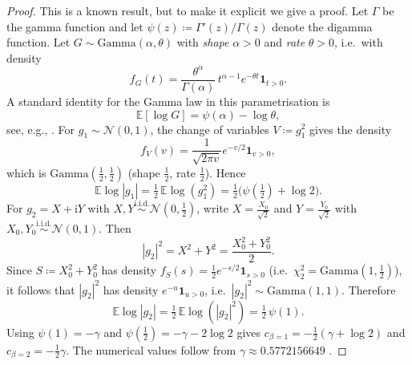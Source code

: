 \documentclass[11pt,a4paper]{article}
\newcommand{\be}{\begin{equation}}
\newcommand{\ee}{\end{equation}}
\begin{document}
\begin{proof}
This is a known result, but to make it explicit we give a proof. Let $\Gamma$ be the gamma function and let $\psi(z)\coloneq \Gamma'(z)/\Gamma(z)$ denote the digamma function.
Let $G\sim\mathrm{Gamma}(\alpha,\theta)$ with \textit{shape} $\alpha>0$ and \emph{rate} $\theta>0$, i.e.\ with density
\be
f_G(t)=\frac{\theta^\alpha}{\Gamma(\alpha)}\,t^{\alpha-1}e^{-\theta t}\mathbf 1_{t>0}.
\ee
A standard identity for the Gamma law in this parametrisation is
\be\label{eq:elog-gamma}
\mathbb E[\log G]=\psi(\alpha)-\log\theta,
\ee
see, e.g., \cite[Ex.~1.25]{JorgensenLabouriau2012}. For $g_1\sim\mathcal N(0,1)$, the change of variables $V\coloneq g_1^2$ gives the density
\be
f_V(v)=\frac{1}{\sqrt{2\pi v}}e^{-v/2}\mathbf 1_{v>0},
\ee
which is $\mathrm{Gamma}(\tfrac12,\tfrac12)$ (shape $\tfrac12$, rate $\tfrac12$). Hence
\be
\mathbb E\log|g_1|=\tfrac12\,\mathbb E\log(g_1^2)=\tfrac12\big(\psi(\tfrac12)+\log 2\big).
\ee
For $g_2=X+\mathrm{i}Y$ with $X,Y\overset{\mathrm{i.i.d.}}{\sim}\mathcal N(0,\tfrac12)$, write $X=\frac{X_0}{\sqrt2}$ and $Y=\frac{Y_0}{\sqrt2}$ with $X_0,Y_0\overset{\mathrm{i.i.d.}}{\sim}\mathcal N(0,1)$. Then
\be
|g_2|^2=X^2+Y^2=\frac{X_0^2+Y_0^2}{2}.
\ee
Since $S\coloneq X_0^2+Y_0^2$ has density $f_S(s)=\frac12 e^{-s/2}\mathbf 1_{s>0}$ (i.e.\ $\chi^2_2=\mathrm{Gamma}(1,\tfrac12)$), it follows that $|g_2|^2$ has density $e^{-u}\mathbf 1_{u>0}$, i.e.\ $|g_2|^2\sim\mathrm{Gamma}(1,1)$. Therefore
\be
\mathbb E\log|g_2|=\tfrac12\,\mathbb E\log(|g_2|^2)=\tfrac12\,\psi(1).
\ee
Using $\psi(1)=-\gamma$ and $\psi(\tfrac12)=-\gamma-2\log 2$ \cite[\S5.4(ii), Eqns.~(5.4.12)-(5.4.13)]{DLMF} gives $c_{\beta=1}=-\tfrac12(\gamma+\log 2)$ and $c_{\beta=2}=-\tfrac12\gamma$. The numerical values follow from $\gamma\approx 0.5772156649$ \cite[\S5.2(ii), Eq.~(5.2.3)]{DLMF}.
\end{proof}
\end{document}
